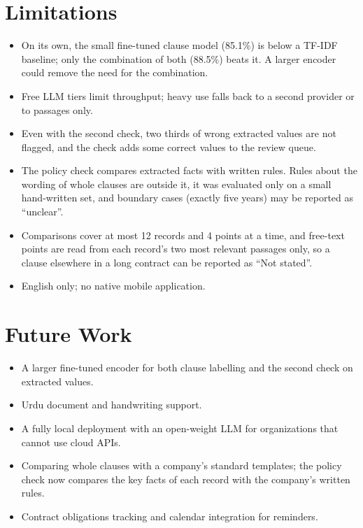 \section{Limitations}
\begin{itemize}
\item On its own, the small fine-tuned clause model (85.1\%) is below a TF-IDF baseline; only the
combination of both (88.5\%) beats it. A larger encoder could remove the need for the combination.
\item Free LLM tiers limit throughput; heavy use falls back to a second provider or to passages only.
\item Even with the second check, two thirds of wrong extracted values are not flagged, and the check adds
some correct values to the review queue.
\item The policy check compares extracted facts with written rules. Rules about the wording of whole
clauses are outside it, it was evaluated only on a small hand-written set, and boundary cases (exactly five
years) may be reported as ``unclear''.
\item Comparisons cover at most 12 records and 4 points at a time, and free-text points are read from each
record's two most relevant passages only, so a clause elsewhere in a long contract can be reported as
``Not stated''.
\item English only; no native mobile application.
\end{itemize}

\section{Future Work}
\begin{itemize}
\item A larger fine-tuned encoder for both clause labelling and the second check on extracted values.
\item Urdu document and handwriting support.
\item A fully local deployment with an open-weight LLM for organizations that cannot use cloud APIs.
\item Comparing whole clauses with a company's standard templates; the policy check now compares the key
facts of each record with the company's written rules.
\item Contract obligations tracking and calendar integration for reminders.
\end{itemize}
